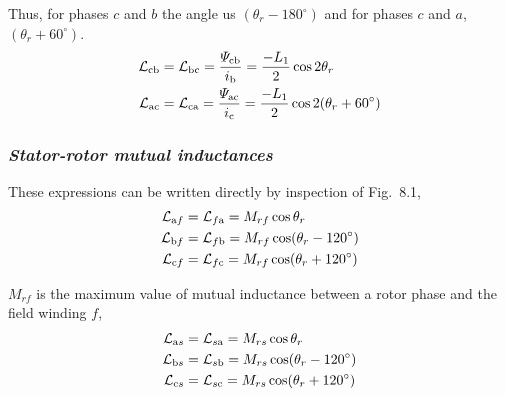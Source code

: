 \documentclass[a4paper,numbers=noenddot,12pt]{scrbook}
\begin{document}
    Thus, for phases $c$ and $b$ the angle us $(\theta_r - 180^{\circ})$ and for phases $c$ and $a$, $(\theta_r + 60^{\circ})$.
    \begin{align}
        \mathcal{L}_{\textup{cb}} & = \mathcal{L}_{\textup{bc}} = \dfrac{\varPsi_{\textup{cb}}}{i_{\textup{b}}} = \dfrac{-L_1}{2} \cos 2\theta_r \\
        \mathcal{L}_{\textup{ac}} & = \mathcal{L}_{\textup{ca}} = \dfrac{\varPsi_{\textup{ac}}}{i_{\textup{c}}} = \dfrac{-L_1}{2} \cos 2(\theta_r + 60^{\circ}) 
        \label{eq:Eq8.16}
    \end{align}

    \subsubsection{\textit{Stator-rotor mutual inductances}}
    These expressions can be written directly by inspection of Fig.\ 8.1,
    \begin{equation}
        \begin{aligned}
            \mathcal{L}_{\textup{a}f} & = \mathcal{L}_{f\textup{a}} = M_{rf} \cos \theta_r \\
            \mathcal{L}_{\textup{b}f} & = \mathcal{L}_{f\textup{b}} = M_{rf} \cos (\theta_r - 120^{\circ}) \\
            \mathcal{L}_{\textup{c}f} & = \mathcal{L}_{f\textup{c}} = M_{rf} \cos (\theta_r + 120^{\circ}) \\
        \end{aligned}
        \label{eq:Eq8.17}
    \end{equation}

    $M_{rf}$ is the maximum value of mutual inductance between a rotor phase and the field winding $f$,
    \begin{equation}
        \begin{aligned}
            \mathcal{L}_{\textup{a}s} & = \mathcal{L}_{s\textup{a}} = M_{rs} \cos \theta_r \\
            \mathcal{L}_{\textup{b}s} & = \mathcal{L}_{s\textup{b}} = M_{rs} \cos (\theta_r - 120^{\circ}) \\
            \mathcal{L}_{\textup{c}s} & = \mathcal{L}_{s\textup{c}} = M_{rs} \cos (\theta_r + 120^{\circ}) \\
        \end{aligned}
        \label{eq:Eq8.18}
    \end{equation}
\end{document}
